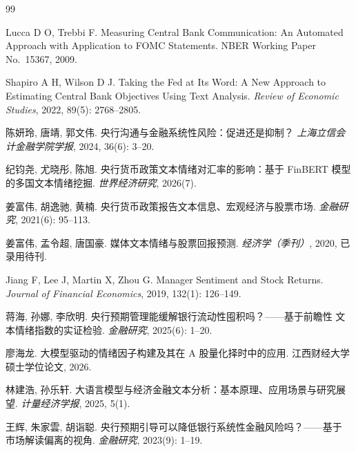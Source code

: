 
\begin{thebibliography}{99}
\footnotesize

Lucca D O, Trebbi F. Measuring Central Bank Communication: An Automated
Approach with Application to FOMC Statements. NBER Working Paper No.~15367, 2009.

Shapiro A H, Wilson D J. Taking the Fed at Its Word: A New Approach to
Estimating Central Bank Objectives Using Text Analysis.
\textit{Review of Economic Studies}, 2022, 89(5): 2768--2805.

陈妍玲, 唐靖, 郭文伟. 央行沟通与金融系统性风险：促进还是抑制？
\textit{上海立信会计金融学院学报}, 2024, 36(6): 3--20.

纪钧尧, 尤晓彤, 陈旭. 央行货币政策文本情绪对汇率的影响：基于 FinBERT
模型的多国文本情绪挖掘. \textit{世界经济研究}, 2026(7).

姜富伟, 胡逸驰, 黄楠. 央行货币政策报告文本信息、宏观经济与股票市场.
\textit{金融研究}, 2021(6): 95--113.

姜富伟, 孟令超, 唐国豪. 媒体文本情绪与股票回报预测.
\textit{经济学（季刊）}, 2020, 已录用待刊.

Jiang F, Lee J, Martin X, Zhou G. Manager Sentiment and Stock Returns.
\textit{Journal of Financial Economics}, 2019, 132(1): 126--149.

蒋海, 孙娜, 李欣明. 央行预期管理能缓解银行流动性囤积吗？——基于前瞻性
文本情绪指数的实证检验. \textit{金融研究}, 2025(6): 1--20.

廖海龙. 大模型驱动的情绪因子构建及其在 A 股量化择时中的应用.
江西财经大学硕士学位论文, 2026.

林建浩, 孙乐轩. 大语言模型与经济金融文本分析：基本原理、应用场景与研究展望.
\textit{计量经济学报}, 2025, 5(1).

王辉, 朱家雲, 胡诣聪. 央行预期引导可以降低银行系统性金融风险吗？——基于
市场解读偏离的视角. \textit{金融研究}, 2023(9): 1--19.


\end{thebibliography}
